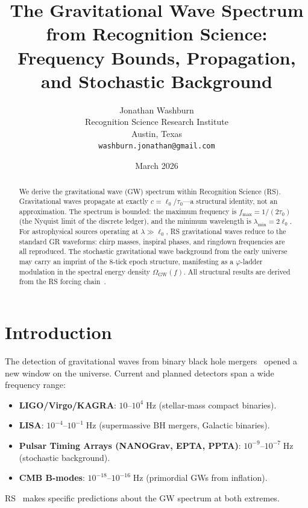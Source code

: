 \documentclass[12pt,a4paper]{article}
\title{The Gravitational Wave Spectrum from Recognition Science:\\
Frequency Bounds, Propagation, and Stochastic Background}
\author{Jonathan Washburn\\
Recognition Science Research Institute\\
Austin, Texas\\
\texttt{washburn.jonathan@gmail.com}}
\date{March 2026}
\theoremstyle{definition}
\theoremstyle{remark}
\begin{document}
\maketitle

\begin{abstract}
We derive the gravitational wave (GW) spectrum within Recognition
Science (RS).  Gravitational waves propagate at exactly
$c = \ell_0/\tau_0$---a structural identity, not an approximation.
The spectrum is bounded: the maximum frequency is
$f_{\max} = 1/(2\tau_0)$ (the Nyquist limit of the discrete
ledger), and the minimum wavelength is $\lambda_{\min} = 2\ell_0$.
For astrophysical sources operating at $\lambda \gg \ell_0$, RS
gravitational waves reduce to the standard GR waveforms: chirp
masses, inspiral phases, and ringdown frequencies are all
reproduced.  The stochastic gravitational wave background from the
early universe may carry an imprint of the 8-tick epoch structure,
manifesting as a $\varphi$-ladder modulation in the spectral energy
density $\Omega_{\mathrm{GW}}(f)$.  All structural results are
derived from the RS forcing chain~\cite{RS_Axioms}.
\end{abstract}

\section{Introduction}
\label{sec:intro}

The detection of gravitational waves from binary black hole
mergers~\cite{LIGO2016} opened a new window on the universe.
Current and planned detectors span a wide frequency range:
\begin{itemize}
  \item \textbf{LIGO/Virgo/KAGRA}: $10$--$10^4\;\mathrm{Hz}$
  (stellar-mass compact binaries).
  \item \textbf{LISA}: $10^{-4}$--$10^{-1}\;\mathrm{Hz}$
  (supermassive BH mergers, Galactic binaries).
  \item \textbf{Pulsar Timing Arrays (NANOGrav, EPTA, PPTA)}:
  $10^{-9}$--$10^{-7}\;\mathrm{Hz}$ (stochastic background).
  \item \textbf{CMB B-modes}: $10^{-18}$--$10^{-16}\;\mathrm{Hz}$
  (primordial GWs from inflation).
\end{itemize}

RS~\cite{RS_Axioms} makes specific predictions about the GW spectrum
at both extremes.
\end{document}
